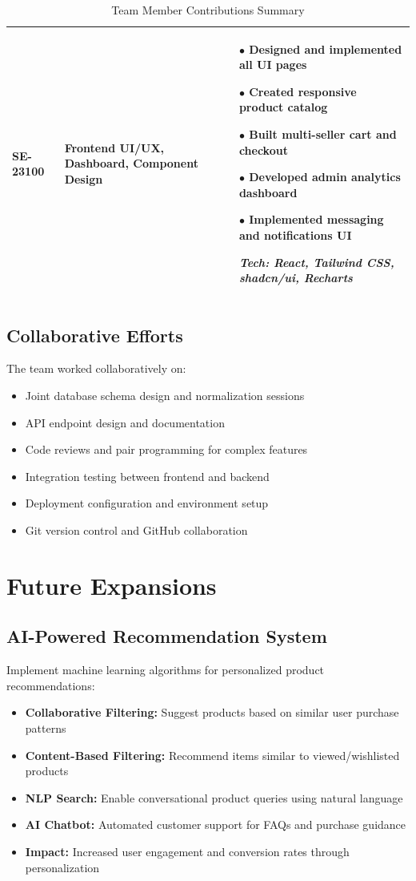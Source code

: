 \documentclass[12pt,a4paper]{article}
\begin{document}
\begin{table}[H]
\begin{tabular}{|p{2.2cm}|p{4.5cm}|p{7cm}|}
\vspace{0.1cm}
SE-23100 & 
Frontend UI/UX, Dashboard, Component Design &
$\bullet$ Designed and implemented all UI pages

$\bullet$ Created responsive product catalog

$\bullet$ Built multi-seller cart and checkout

$\bullet$ Developed admin analytics dashboard

$\bullet$ Implemented messaging and notifications UI

\vspace{0.1cm}
\textit{Tech: React, Tailwind CSS, shadcn/ui, Recharts} \\
\hline
\end{tabular}
\caption{Team Member Contributions Summary}
\end{table}

\subsection{Collaborative Efforts}
The team worked collaboratively on:
\begin{itemize}
    \item Joint database schema design and normalization sessions
    \item API endpoint design and documentation
    \item Code reviews and pair programming for complex features
    \item Integration testing between frontend and backend
    \item Deployment configuration and environment setup
    \item Git version control and GitHub collaboration
\end{itemize}

\newpage

\section{Future Expansions}

\subsection{AI-Powered Recommendation System}
Implement machine learning algorithms for personalized product recommendations:
\begin{itemize}
    \item \textbf{Collaborative Filtering:} Suggest products based on similar user purchase patterns
    \item \textbf{Content-Based Filtering:} Recommend items similar to viewed/wishlisted products
    \item \textbf{NLP Search:} Enable conversational product queries using natural language
    \item \textbf{AI Chatbot:} Automated customer support for FAQs and purchase guidance
    \item \textbf{Impact:} Increased user engagement and conversion rates through personalization
\end{itemize}
\end{document}
